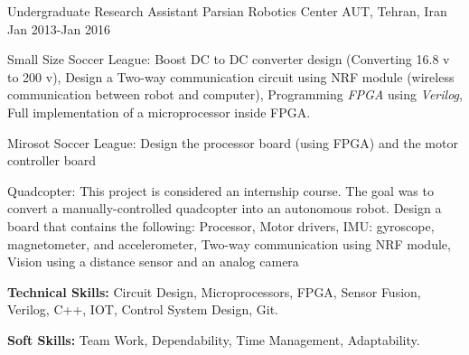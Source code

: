 \begin{cventries}
  \cventry
 {Undergraduate Research Assistant}  %
    {Parsian Robotics Center} %
    {AUT, Tehran, Iran} %
    {Jan 2013-Jan 2016} %
    {
          \begin{cvitems} %
            \item {Small Size Soccer League:	Boost DC to DC converter design (Converting 16.8 v to 200 v),	Design a Two-way communication circuit using NRF module (wireless communication between robot and computer), Programming \textit{FPGA} using \textit{Verilog}, Full implementation of a microprocessor inside FPGA.}
            \item {Mirosot Soccer League:	Design the processor board (using FPGA) and the motor controller board}
            \item{Quadcopter: This project is considered an internship course. The goal was to convert a manually-controlled quadcopter into an autonomous robot. Design a board that contains the following: Processor, Motor drivers, IMU: gyroscope, magnetometer, and accelerometer, Two-way communication using NRF module, Vision using a distance sensor and an analog camera}
            \item {\textbf{Technical Skills:} Circuit Design, Microprocessors, FPGA, Sensor Fusion, Verilog, C++, IOT, Control System Design, Git.}
        \item {\textbf{Soft Skills:} Team Work, Dependability, Time Management, Adaptability.}
          \end{cvitems}
    }   
\end{cventries}



